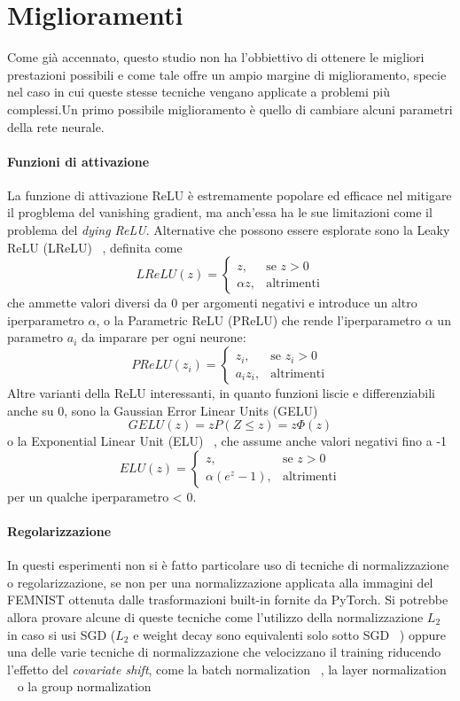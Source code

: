 \chapter{Miglioramenti}
Come già accennato, questo studio non ha l'obbiettivo di ottenere le 
migliori prestazioni possibili e come tale offre un ampio margine di 
miglioramento, specie nel caso in cui queste stesse tecniche vengano 
applicate a problemi più complessi.Un primo possibile miglioramento 
è quello di cambiare alcuni parametri 
della rete neurale. 


\subsubsection{Funzioni di attivazione}
La funzione di attivazione ReLU è 
estremamente popolare ed efficace nel mitigare il progblema del 
vanishing gradient, ma anch'essa ha le sue limitazioni come il 
problema del \textit{dying ReLU}. Alternative che possono essere 
esplorate sono la Leaky ReLU (LReLU) ~\cite{Maas2013RectifierNI},
definita come
\[
LReLU(z) = 
\begin{cases} 
      z, & \text{se } z > 0 \\
      \alpha z, & \text{altrimenti}
\end{cases}
\]
che ammette valori diversi da 0 per argomenti negativi e introduce un 
altro iperparametro \(\alpha\),
o la Parametric ReLU (PReLU) che rende l'iperparametro \(\alpha\)
un parametro \(a_i\) da imparare per ogni neurone:
\[
PReLU(z_i) = 
\begin{cases} 
      z_i, & \text{se } z_i > 0 \\
      a_i z_i, & \text{altrimenti}
\end{cases}
\]
Altre varianti della ReLU interessanti, in quanto funzioni liscie e 
differenziabili anche su 0, sono la Gaussian Error Linear Units (GELU)
~\cite{hendrycks2016gelu}
\[
GELU(z) = z P(Z \le z) = z \Phi(z)
\]
o la Exponential Linear Unit (ELU) ~\cite{clevert2016elu}, 
che assume anche valori negativi fino a -1
\[
ELU(z) = 
\begin{cases} 
      z, & \text{se } z > 0 \\
      \alpha (e^z - 1), & \text{altrimenti}
\end{cases}
\]
per un qualche iperparametro \alpha < 0.


\subsubsection{Regolarizzazione}
In questi esperimenti non si è fatto particolare uso di tecniche di 
normalizzazione o regolarizzazione, se non per una normalizzazione 
applicata alla immagini del FEMNIST ottenuta dalle trasformazioni 
built-in fornite da PyTorch. Si potrebbe allora provare alcune di 
queste tecniche come l'utilizzo della normalizzazione \(L_2\) in caso si 
usi SGD (\(L_2\) e weight decay sono equivalenti solo sotto SGD 
~\cite{Loshchilov2017AdamW}) oppure una delle varie tecniche di 
normalizzazione che velocizzano il training riducendo l'effetto del 
\textit{covariate shift}, come la batch normalization ~\cite{ioffe2015batch},
la layer normalization ~\cite{ba2016layer} o la group normalization 
~\cite{wu2018group}


